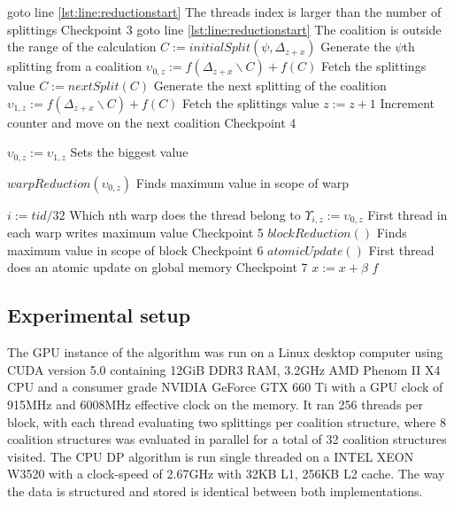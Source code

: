 \documentclass{llncs}
\begin{document}
\begin{algorithm}[!h]
\begin{algorithmic}[1]
  \IF{$\psi \geq \Psi$}
    \STATE goto line \ref{lst:line:reductionstart} \hfill The threads index is larger than the number of splittings
  \ENDIF
\hfill Checkpoint 3
    \label{lst:line:gotoif}
      \STATE goto line \ref{lst:line:reductionstart} \hfill The coalition is outside the range of the calculation
    \ENDIF
    \STATE $C := initialSplit(\psi,\Delta_{z+x})$ \hfill Generate the $\psi$th splitting from a coalition 
    \STATE $\upsilon_{0,z} := f(\Delta_{z+x}\backslash C)+f(C)$ \hfill Fetch the splittings value
    \STATE $C := nextSplit(C)$ \hfill Generate the next splitting of the coalition
    \STATE $\upsilon_{1,z} := f(\Delta_{z+x}\backslash C)+f(C)$ \hfill Fetch the splittings value
    \STATE $z := z + 1$ \hfill Increment counter and move on the next coalition
  \ENDFOR
\hfill Checkpoint 4
  \label{lst:line:reductionstart}
  
    \label{lst:line:checkif}
      \STATE $\upsilon_{0,z} := \upsilon_{1,z}$ \hfill Sets the biggest value
    \ENDIF
    
    \STATE $warpReduction(\upsilon_{0,z})$ \hfill Finds maximum value in scope of warp

      \STATE $i := tid / 32$ \hfill Which nth warp does the thread belong to
      \STATE $\Upsilon_{i,z} := \upsilon_{0,z}$ \hfill First thread in each warp writes maximum value
    \ENDIF
  \ENDFOR   \hfill Checkpoint 5
  \STATE $blockReduction()$\label{lst:line:blockReduction} \hfill Finds maximum value in scope of block
  \hfill Checkpoint 6
  \STATE $atomicUpdate()$\label{lst:line:reductionend} \hfill First thread does an atomic update on global memory
  \ENDIF  \hfill Checkpoint 7
  \STATE $x := x + \beta$
\ENDFOR
\RETURN $f$
\end{algorithmic}
\end{algorithm}

\subsection{Experimental setup}

The GPU instance of the algorithm was run on a Linux desktop computer using CUDA version 5.0 containing 12GiB DDR3 RAM, 
3.2GHz AMD Phenom II X4 CPU and a consumer grade NVIDIA GeForce GTX 660 Ti with a GPU clock of 915MHz and 6008MHz effective clock on the memory.
It ran 256 threads per block, with each thread evaluating two splittings per coalition structure, 
where 8 coalition structures was evaluated in parallel for a total of 32 coalition structures visited.
The CPU DP algorithm is run single threaded on a INTEL XEON W3520 with a clock-speed of 2.67GHz with 32KB L1, 256KB L2 cache. 
The way the data is structured and stored is identical between both implementations.
\end{document}
